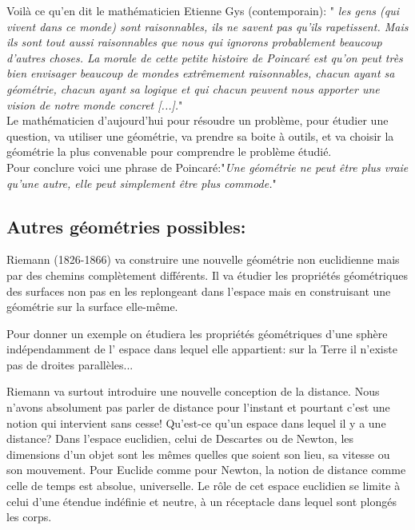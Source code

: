 \documentclass[a4paper, 12pt, twoside]{book}
\begin{document}
  \newpage Voilà ce qu'en dit le mathématicien Etienne Gys (contemporain):
" \textit{les  gens (qui vivent dans ce monde) sont raisonnables, ils ne savent pas qu’ils rapetissent. Mais ils sont tout aussi raisonnables que nous qui ignorons probablement beaucoup d’autres choses. La morale de cette petite histoire de Poincaré est qu’on peut très bien envisager beaucoup de mondes extrêmement raisonnables, chacun ayant sa géométrie, chacun ayant sa logique et qui chacun peuvent nous apporter une vision de notre monde concret [...].}"\\


Le mathématicien d'aujourd’hui pour résoudre un problème, pour étudier une question, va utiliser une géométrie, va prendre sa boite à outils, et va choisir la géométrie la plus convenable pour comprendre le problème étudié.\\

Pour conclure voici une phrase de Poincaré:"\textit{Une géométrie ne peut être plus vraie qu’une autre, elle peut simplement être plus commode.}" \\
  
  \subsection{Autres géométries possibles:}
  
     Riemann (1826-1866) va construire une nouvelle géométrie non euclidienne mais par des chemins complètement différents. Il va étudier les propriétés géométriques des surfaces non pas en les replongeant dans l’espace mais en construisant une géométrie sur la surface elle-même.\medskip 
     
 Pour donner un exemple on étudiera les propriétés géométriques d’une sphère indépendamment de l’ espace dans lequel elle appartient: sur la Terre il n’existe pas de droites parallèles...\medskip
 
 Riemann va surtout introduire une nouvelle conception de la distance.
  Nous n’avons absolument pas parler de distance pour l’instant et pourtant c’est une notion qui intervient sans cesse! Qu’est-ce qu’un espace dans lequel il y a une distance?     
 Dans l’espace euclidien, celui de Descartes ou de Newton, les dimensions d’un objet sont les mêmes quelles que soient son lieu, sa vitesse ou son mouvement. \medskip
 Pour Euclide comme pour Newton, la notion de distance comme celle de temps est absolue, universelle. Le rôle de cet espace euclidien se limite à celui d’une étendue indéfinie et neutre, à un réceptacle dans lequel sont plongés les corps.\medskip
 
\end{document}
